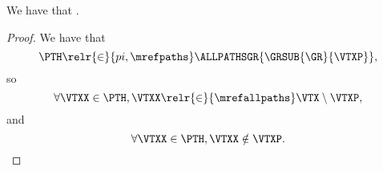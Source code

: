 \begin{proposition}
  We have that \pathsubcondfprop.%
\end{proposition}

\begin{proof}
  We have that
  $$\PTH \relr {\in} {pi,\mrefpaths} \ALLPATHSGR{\GRSUB{\GR}{\VTXP}},$$
  so
  $$\forall \VTXX \in \PTH, \VTXX \relr {\in} {\mrefallpaths} \VTX \setminus \VTXP,$$
  and
  $$\forall \VTXX \in \PTH, \VTXX \notin \VTXP.$$%
\end{proof}
